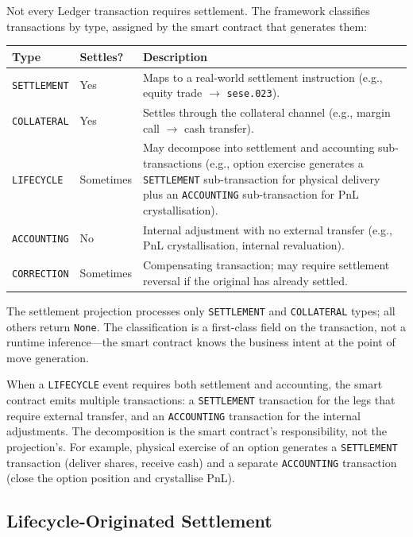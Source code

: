 \documentclass[11pt,a4paper]{article}
\begin{document}
Not every Ledger transaction requires settlement. The framework classifies transactions by type, assigned by the smart contract that generates them:

\begin{center}
\begin{tabular}{l l p{7.5cm}}
\toprule
\textbf{Type} & \textbf{Settles?} & \textbf{Description} \\
\midrule
\texttt{SETTLEMENT} & Yes & Maps to a real-world settlement instruction (e.g., equity trade $\to$ \texttt{sese.023}). \\
\texttt{COLLATERAL} & Yes & Settles through the collateral channel (e.g., margin call $\to$ cash transfer). \\
\texttt{LIFECYCLE} & Sometimes & May decompose into settlement and accounting sub-transactions (e.g., option exercise generates a \texttt{SETTLEMENT} sub-transaction for physical delivery plus an \texttt{ACCOUNTING} sub-transaction for PnL crystallisation). \\
\texttt{ACCOUNTING} & No & Internal adjustment with no external transfer (e.g., PnL crystallisation, internal revaluation). \\
\texttt{CORRECTION} & Sometimes & Compensating transaction; may require settlement reversal if the original has already settled. \\
\bottomrule
\end{tabular}
\end{center}

\noindent The settlement projection processes only \texttt{SETTLEMENT} and \texttt{COLLATERAL} types; all others return \texttt{None}. The classification is a first-class field on the transaction, not a runtime inference---the smart contract knows the business intent at the point of move generation.

When a \texttt{LIFECYCLE} event requires both settlement and accounting, the smart contract emits multiple transactions: a \texttt{SETTLEMENT} transaction for the legs that require external transfer, and an \texttt{ACCOUNTING} transaction for the internal adjustments. The decomposition is the smart contract's responsibility, not the projection's. For example, physical exercise of an option generates a \texttt{SETTLEMENT} transaction (deliver shares, receive cash) and a separate \texttt{ACCOUNTING} transaction (close the option position and crystallise PnL).

\subsection{Lifecycle-Originated Settlement}
\label{sec:settlement-lifecycle}
\end{document}
